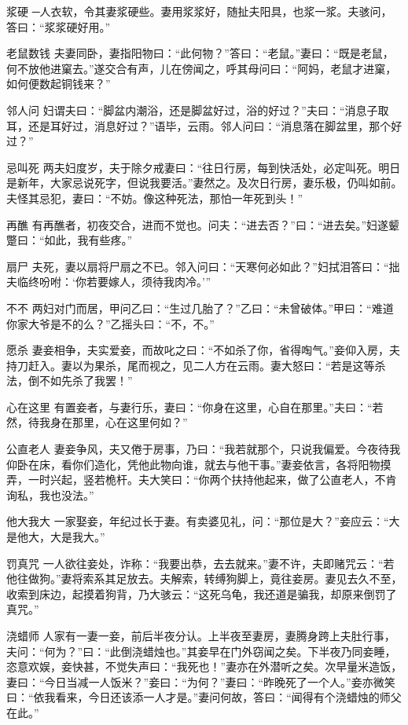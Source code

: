 \documentclass[12pt,UTF8]{ctexbook}
\begin{document}
浆硬
─人衣软，令其妻浆硬些。妻用浆浆好，随扯夫阳具，也浆一浆。夫骇问，答曰：“浆浆硬好用。”

老鼠数钱
夫妻同卧，妻指阳物曰：“此何物？”答曰：“老鼠。”妻曰：“既是老鼠，何不放他进窠去。”遂交合有声，儿在傍闻之，呼其母问曰：“阿妈，老鼠才进窠，如何便数起铜钱来？”

邻人问
妇谓夫曰：“脚盆内潮浴，还是脚盆好过，浴的好过？”夫曰：“消息子取耳，还是耳好过，消息好过？”语毕，云雨。邻人问曰：“消息落在脚盆里，那个好过？”

忌叫死
两夫妇度岁，夫于除夕戒妻曰：“往日行房，每到快活处，必定叫死。明日是新年，大家忌说死字，但说我要活。”妻然之。及次日行房，妻乐极，仍叫如前。夫怪其忌犯，妻曰：“不妨。像这种死法，那怕一年死到头！”

再醮
有再醮者，初夜交合，进而不觉也。问夫：“进去否？”曰：“进去矣。”妇遂颦蹩曰：“如此，我有些疼。”

扇尸
夫死，妻以扇将尸扇之不已。邻入问曰：“天寒何必如此？”妇拭泪答曰：“拙夫临终吩咐：‘你若要嫁人，须待我肉冷。’”

不不
两妇对门而居，甲问乙曰：“生过几胎了？”乙曰：“未曾破体。”甲曰：“难道你家大爷是不的么？”乙摇头曰：“不，不。”

愿杀
妻妾相争，夫实爱妾，而故叱之曰：“不如杀了你，省得啕气。”妾仰入房，夫持刀赶入。妻以为果杀，尾而视之，见二人方在云雨。妻大怒曰：“若是这等杀法，倒不如先杀了我罢！”

心在这里
有置妾者，与妻行乐，妻曰：“你身在这里，心自在那里。”夫曰：“若然，待我身在那里，心在这里何如？”

公直老人
妻妾争风，夫又倦于房事，乃曰：“我若就那个，只说我偏爱。今夜待我仰卧在床，看你们造化，凭他此物向谁，就去与他干事。”妻妾依言，各将阳物摸弄，一时兴起，竖若桅杆。夫大笑曰：“你两个扶持他起来，做了公直老人，不肯询私，我也没法。”

他大我大
一家娶妾，年纪过长于妻。有卖婆见礼，问：“那位是大？”妾应云：“大是他大，大是我大。”

罚真咒
一人欲往妾处，诈称：“我要出恭，去去就来。”妻不许，夫即赌咒云：“若他往做狗。”妻将索系其足放去。夫解索，转缚狗脚上，竟往妾房。妻见去久不至，收索到床边，起摸着狗背，乃大骇云：“这死乌龟，我还道是骗我，却原来倒罚了真咒。”

浇蜡师
人家有一妻一妾，前后半夜分认。上半夜至妻房，妻腾身跨上夫肚行事，夫问：“何为？”曰：“此倒浇蜡烛也。”其妾早在门外窃闻之矣。下半夜乃同妾睡，恣意欢娱，妾快甚，不觉失声曰：“我死也！”妻亦在外潜听之矣。次早量米造饭，妻曰：“今日当减一人饭米？”妾曰：“为何？”妻曰：“昨晚死了一个人。”妾亦微笑曰：“依我看来，今日还该添一人才是。”妻问何故，答曰：“闻得有个浇蜡烛的师父在此。”
\end{document}
